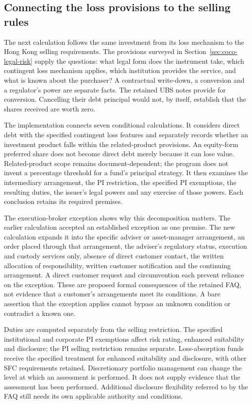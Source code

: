 \documentclass[12pt,a4paper,oneside,openany]{book}
\begin{document}
\subsection{Connecting the loss provisions to the selling rules}
\label{sec:joined-eligibility}

The next calculation follows the same investment from its loss mechanism to
the Hong Kong selling requirements. The provisions surveyed in
Section~\ref{sec:coco-legal-risk} supply the questions: what legal form does the
instrument take, which contingent loss mechanism applies, which institution
provides the service, and what is known about the purchaser? A contractual
write-down, a conversion and a regulator's power are separate facts. The
retained UBS notes provide for conversion. Cancelling their debt principal
would not, by itself, establish that the shares received are worth zero.

The implementation connects seven conditional calculations. It considers direct
debt with the specified contingent loss features and separately records whether
an investment product falls within the related-product provisions. An
equity-form preferred share does not become direct debt merely because it can
lose value. Related-product scope remains document-dependent; the program does
not invent a percentage threshold for a fund's principal strategy. It then
examines the intermediary arrangement, the PI restriction, the specified PI
exemptions, the resulting duties, the issuer's legal powers and any exercise of
those powers. Each conclusion retains its required premises.

The execution-broker exception shows why this decomposition matters. The
earlier calculation accepted an established exception as one premise. The new
calculation expands it into the specific adviser or asset-manager arrangement,
an order placed through that arrangement, the adviser's regulatory status,
execution and custody services only, absence of direct customer contact, the
written allocation of responsibility, written customer notification and the
continuing arrangement. A direct customer request and circumvention each
prevent reliance on the exception. These are proposed formal consequences of
the retained FAQ, not evidence that a customer's arrangements meet its
conditions. A bare assertion that the exception applies cannot bypass an
unknown condition or contradict a known one.

Duties are computed separately from the selling restriction. The specified
institutional and corporate PI exemptions affect risk rating, enhanced
suitability and disclosure; the PI selling restriction remains separate.
Loss-absorption funds receive the specified treatment for enhanced suitability
and disclosure, with other SFC requirements retained. Discretionary portfolio
management can change the level at which an assessment is performed. It does
not supply evidence that the assessment has been performed. Additional
disclosure flexibility referred to by the FAQ still needs its own applicable
authority and conditions.
\end{document}
